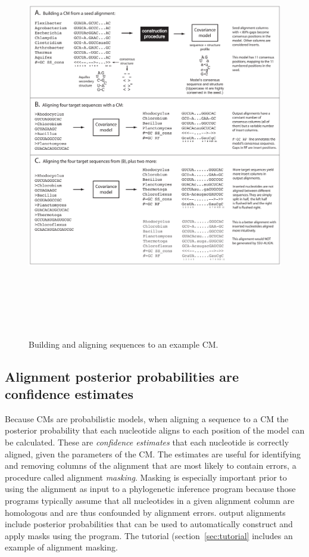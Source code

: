 \begin{figure}
\begin{center}
\includegraphics[height=7in]{Figures/sa-toy-example}
\caption{Building and aligning sequences to an example CM.}
\end{center}
\label{fig:toyex}
\end{figure}


\subsection{Alignment posterior probabilities are confidence estimates}

Because CMs are probabilistic models, when aligning a sequence to a CM
the posterior probability that each nucleotide aligns to each position
of the model can be calculated. 
These are \emph{confidence estimates} that each
nucleotide is correctly aligned, given the parameters of the CM. The
estimates are useful for identifying and removing columns of the
alignment that are most likely to contain errors, a procedure called
alignment \emph{masking}. Masking is especially important prior to
using the alignment as input to a phylogenetic inference program
because those programs typically assume that all nucleotides in a
given alignment column are homologous and are thus confounded by 
alignment errors.  output alignments include posterior
probabilities that can be used to automatically construct and apply
masks using the  program. The tutorial
(section~\ref{sec:tutorial} includes an example of alignment masking. 


